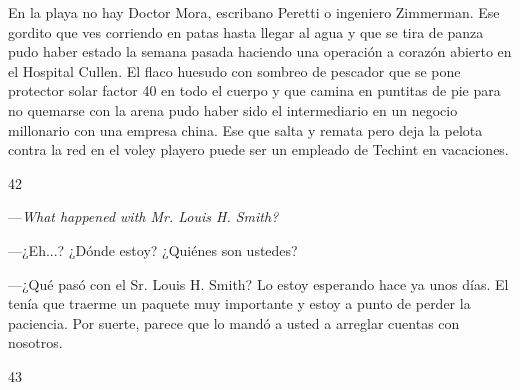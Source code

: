 \documentclass[12pt,twoside,openright,a5paper]{book}
\begin{document}
\nopagebreak

\vspace{0.5cm}

\nopagebreak

En la playa no hay Doctor Mora, escribano Peretti
o ingeniero Zimmerman. Ese gordito que ves corriendo en patas hasta llegar
al agua y que se tira de panza pudo haber estado la semana pasada haciendo una
operación a corazón abierto en el Hospital Cullen.
El flaco huesudo con sombreo de pescador que se pone protector solar factor 
40 en todo el cuerpo y que camina en puntitas de pie para no quemarse 
con la arena pudo haber sido
el intermediario en un negocio millonario con una empresa china. Ese que
salta y remata pero deja la pelota contra la red en el voley playero puede
ser un empleado de Techint en vacaciones.

\vspace{0.5cm}

\hrulefill \hspace{0.1cm}\decofourleft\hspace{0.2cm} 42 \hspace{0.2cm}\decofourright \hspace{0.1cm}\hrulefill

\nopagebreak

\vspace{0.5cm}

\nopagebreak

---\emph{What happened with Mr. Louis H. Smith?}

---¿Eh...? ¿Dónde estoy? ¿Quiénes son ustedes?

---¿Qué pasó con el Sr. Louis H. Smith? Lo estoy esperando hace ya
unos días. El tenía que traerme un paquete muy importante y estoy a
punto de perder la paciencia. Por suerte, parece que lo mandó a usted a arreglar
cuentas con nosotros.

\vspace{0.5cm}

\hrulefill \hspace{0.1cm}\decofourleft\hspace{0.2cm} 43 \hspace{0.2cm}\decofourright \hspace{0.1cm}\hrulefill

\nopagebreak

\vspace{0.5cm}

\nopagebreak
\end{document}
